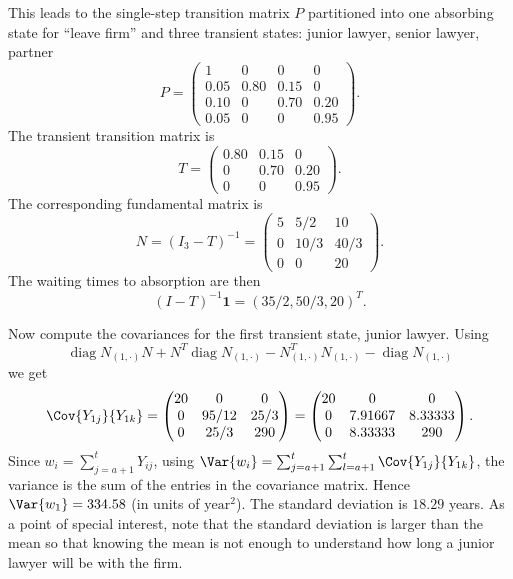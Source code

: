 \documentclass[12pt]{article}
\begin{document}
\begin{solution}
    This leads to the single-step transition matrix \( P \) partitioned
    into one absorbing state for ``leave firm'' and three transient
    states:  junior lawyer, senior lawyer, partner
    \[
        P =
        \begin{pmatrix}
            1 & 0 & 0 & 0 \\
            0.05 & 0.80 & 0.15 & 0 \\
            0.10 & 0 & 0.70 & 0.20 \\
            0.05 & 0 & 0 & 0.95
        \end{pmatrix}
        .
    \] The transient transition matrix is
    \[
        T =
        \begin{pmatrix}
            0.80 & 0.15 & 0 \\
            0 & 0.70 & 0.20 \\
            0 & 0 & 0.95
        \end{pmatrix}
        .
    \] The corresponding fundamental matrix is
    \[
        N= (I_3 - T)^{-1} =
        \begin{pmatrix}
            5 & 5/2 & 10 \\
            0 & 10/3 & 40/3 \\
            0 & 0 & 20
        \end{pmatrix}
        .
    \] The waiting times to absorption are then
    \[
        (I-T)^{-1} \mathbf{1} = (35/2, 50/3, 20)^{T}.
    \]

    Now compute the covariances for the first transient state, junior
    lawyer.  Using
    \[
        \operatorname{diag}
        {N_{(1, \cdot)}} N + N^T
        \operatorname{diag}
        {N_{(1, \cdot)}} - N_{(1, \cdot)}^T N_{(1, \cdot)} -
        \operatorname{diag}
        N_{(1, \cdot)}
    \] we get
    \[
        \Cov{Y_{1j}}{Y_{1k}} =
        \begin{pmatrix}
            20 & 0 & 0 \\
            0 & 95/12 & 25/3 \\
            0 & 25/3 & 290
        \end{pmatrix}
        =
        \begin{pmatrix}
            20 & 0 & 0 \\
            0 & 7.91667 & 8.33333 \\
            0 & 8.33333 & 290
        \end{pmatrix}
        .
    \] %
    Since \( w_i = \sum_{j=a+1}^{t} Y_{ij} \), using \( \Var{w_i} = \sum_
    {j=a+1}^t \sum_{l=a+1}^t \Cov{Y_{1j}}{Y_{1k}} \), the variance is
    the sum of the entries in the covariance matrix.  Hence \( \Var{w_1}
    = 334.58 \) (in units of \( \text{year}^2 \)).  The standard
    deviation is \( 18.29 \) years.  As a point of special interest,
    note that the standard deviation is larger than the mean so that
    knowing the mean is not enough to understand how long a junior
    lawyer will be with the firm.
\end{solution}
\end{document}
